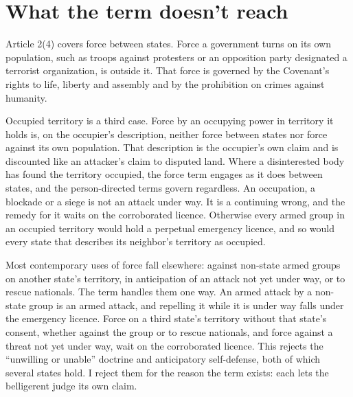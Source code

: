\section{What the term doesn't reach}
\label{sec:5.6}
Article 2(4) covers force between states. Force a government turns on its own population, such as troops against protesters or an opposition party designated a terrorist organization, is outside it. That force is governed by the Covenant's rights to life, liberty and assembly and by the prohibition on crimes against humanity.

Occupied territory is a third case. Force by an occupying power in territory it holds is, on the occupier's description, neither force between states nor force against its own population. That description is the occupier's own claim and is discounted like an attacker's claim to disputed land. Where a disinterested body has found the territory occupied, the force term engages as it does between states, and the person-directed terms govern regardless. An occupation, a blockade or a siege is not an attack under way. It is a continuing wrong, and the remedy for it waits on the corroborated licence. Otherwise every armed group in an occupied territory would hold a perpetual emergency licence, and so would every state that describes its neighbor's territory as occupied.

Most contemporary uses of force fall elsewhere: against non-state armed groups on another state's territory, in anticipation of an attack not yet under way, or to rescue nationals. The term handles them one way. An armed attack by a non-state group is an armed attack, and repelling it while it is under way falls under the emergency licence. Force on a third state's territory without that state's consent, whether against the group or to rescue nationals, and force against a threat not yet under way, wait on the corroborated licence. This rejects the “unwilling or unable” doctrine and anticipatory self-defense, both of which several states hold. I reject them for the reason the term exists: each lets the belligerent judge its own claim.
